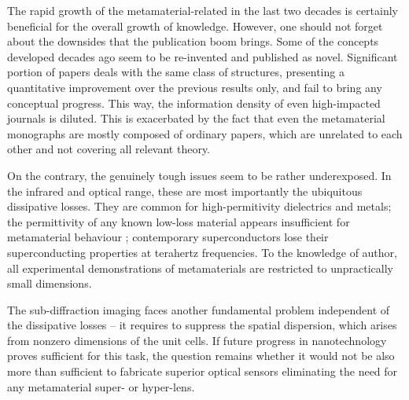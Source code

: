 The rapid growth of the metamaterial-related in the last two decades is certainly beneficial for the overall growth of knowledge. However, one should not forget about the downsides that the publication boom brings. Some of the concepts developed decades ago seem to be re-invented and published as novel. Significant portion of papers deals with the same class of structures, presenting a quantitative improvement over the previous results only, and fail to bring any conceptual progress. This way, the information density of even high-impacted journals is diluted. This is exacerbated by the fact that even the metamaterial monographs are mostly composed of ordinary papers, which are unrelated to each other and not covering all relevant theory.

On the contrary, the genuinely tough issues seem to be rather underexposed. In the infrared and optical range, these are most importantly the ubiquitous dissipative losses. They are common for high-permitivity dielectrics and metals; the permittivity of any known low-loss material appears insufficient for metamaterial behaviour \cite{dominec2014transition}; contemporary superconductors lose their superconducting properties at terahertz frequencies. To the knowledge of author, all experimental demonstrations of metamaterials are restricted to unpractically small dimensions. 
%

The sub-diffraction imaging faces another fundamental problem independent of the dissipative losses -- it requires to suppress the spatial dispersion, which arises from nonzero dimensions of the unit cells. If future progress in nanotechnology proves sufficient for this task, the question remains whether it would not be also more than sufficient to fabricate superior optical sensors eliminating the need for any metamaterial super- or hyper-lens. 

